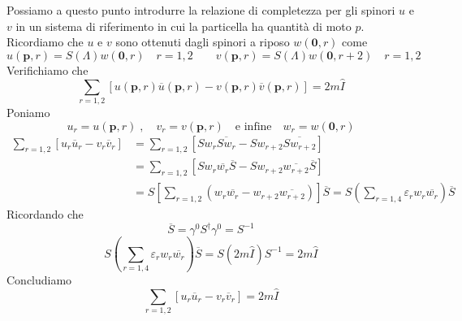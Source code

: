 Possiamo a questo punto introdurre la relazione di completezza per gli spinori $u$ e $v$ in un sistema di riferimento in cui la particella ha quantità di moto $p$. Ricordiamo che $u$ e $v$ sono ottenuti dagli spinori a riposo $w(\mathbf{0},r)$ come
$$
u(\mathbf{p}, r) = S(\Lambda)w(\mathbf{0}, r) \quad r=1,2 \qquad v(\mathbf{p}, r) = S(\Lambda)w(\mathbf{0}, r+2) \quad r=1,2
$$
Verifichiamo che
$$
\sum_{r=1,2} [ u(\mathbf{p}, r) \overline{u}(\mathbf{p}, r) - v(\mathbf{p}, r) \overline{v}(\mathbf{p}, r) ] = 2m\hat{I}
$$
Poniamo
$$
u_r = u(\mathbf{p}, r) \; , \quad v_r = v(\mathbf{p}, r) \quad \text{e infine} \quad w_r = w(\mathbf{0}, r)
$$
\begin{align*}
\sum_{r=1,2} [u_r \overline{u}_r - v_r \overline{v}_r] &= \sum_{r=1,2} [Sw_r \overline{Sw_r} - Sw_{r+2} \overline{Sw_{r+2}}] \\
&= \sum_{r=1,2} [Sw_r \overline{w_r} \overline{S} - Sw_{r+2} \overline{w_{r+2}} \overline{S}] \\
&= S \left[ \sum_{r=1,2} (w_r \overline{w_r} - w_{r+2} \overline{w_{r+2}}) \right] \overline{S} = S \left( \sum_{r=1,4} \varepsilon_r w_r \overline{w_r} \right) \overline{S}
\end{align*}
Ricordando che
$$
\overline{S} = \gamma^0 S^\dagger \gamma^0 = S^{-1}
$$
$$
S \left( \sum_{r=1,4} \varepsilon_r w_r \overline{w_r} \right) \overline{S} = S(2m\hat{I})S^{-1} = 2m\hat{I}
$$
Concludiamo
$$
\sum_{r=1,2} [u_r \overline{u}_r - v_r \overline{v}_r] = 2m\hat{I}
$$